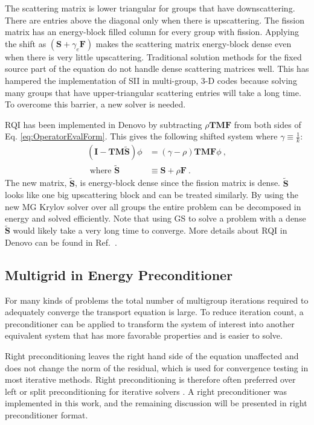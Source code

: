 \documentclass[preprint,12pt]{elsarticle}
\newcommand{\ve}[1]{\ensuremath{\mathbf{#1}}}
\begin{document}
The scattering matrix is lower triangular for groups that have downscattering. There are entries above the diagonal only when there is upscattering. The fission matrix has an energy-block filled column for every group with fission. Applying the shift as $(\ve{S} + \gamma_e \ve{F})$ makes the scattering matrix energy-block dense even when there is very little upscattering. Traditional solution methods for the fixed source part of the equation do not handle dense scattering matrices well. This has hampered the implementation of SII in multi-group, 3-D codes because solving many groups that have upper-triangular scattering entries will take a long time. To overcome this barrier, a new solver is needed. 

RQI has been implemented in Denovo by subtracting $\rho \ve{TMF}$ from both sides of %
Eq. \eqref{eq:OperatorEvalForm}. This gives the following shifted system where $\gamma \equiv \frac{1}{k}$:
%
\begin{align}
  (\ve{I} - \ve{TM}\ve{\tilde{S}})\phi &=( \gamma - \rho) \ve{TMF} \phi  \:, 
  \label{eq:OperatorShiftedEval} \\
  \text{ where } \ve{\tilde{S}} &\equiv \ve{S} + \rho\ve{F}  \nonumber \:.
\end{align}
%
The new matrix, $\ve{\tilde{S}}$, is energy-block dense since the fission matrix is dense. $\ve{\tilde{S}}$ looks like one big upscattering block and can be treated similarly. By using the new MG Krylov solver over all groups the entire problem can be decomposed in energy and solved efficiently. Note that using GS to solve a problem with a dense $\tilde{\ve{S}}$ would likely take a very long time to converge. More details about RQI in Denovo can be found in Ref.\ \cite{Slaybaugh2012}.

\subsection{Multigrid in Energy Preconditioner}
\label{sec:precond}
For many kinds of problems the total number of multigroup iterations required to adequately converge the transport equation is large. To reduce iteration count, a preconditioner can be applied to transform the system of interest into another equivalent system that has more favorable properties and is easier to solve. 
 
Right preconditioning leaves the right hand side of the equation unaffected and does not change the norm of the residual, which is used for convergence testing in most iterative methods. Right preconditioning is therefore often preferred over left or split preconditioning for iterative solvers \cite{Knoll2004}. A right preconditioner was implemented in this work, and the remaining discussion will be presented in right preconditioner format. 
\end{document}
